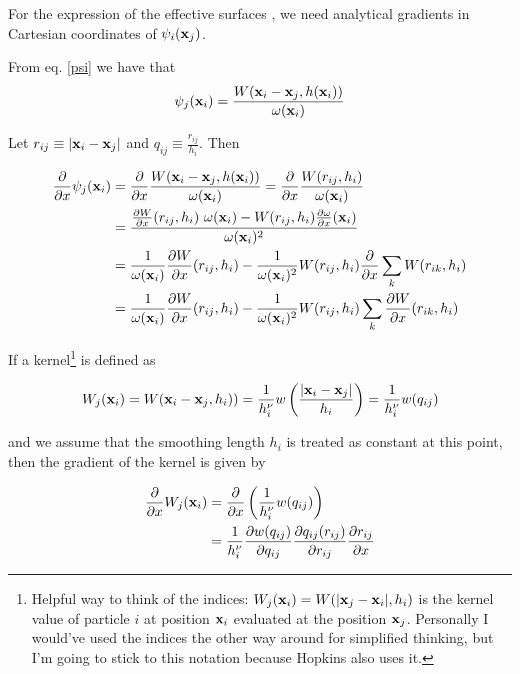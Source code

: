 For the \cite{ivanovaCommonEnvelopeEvolution2013} expression of the effective surfaces \Aij, we need analytical gradients in Cartesian coordinates of $\psi_i(\mathbf{x}_j)$.

From eq. \ref{psi} we have that
\begin{align*}
	\psi_j(\mathbf{x}_i) &= \frac{ W(\mathbf{x}_i - \mathbf{x}_j, h(\mathbf{x}_i))}{\omega(\mathbf{x}_i)}\\
\end{align*}

Let $r_{ij} \equiv |\mathbf{x}_i - \mathbf{x}_j|$ and $q_{ij} \equiv \frac{r_{ij}}{h_i}$. Then

\begin{align}
	\deldx \psi_j(\x_i) 	&= \deldx \frac{ W(\x_i - \x_j, h(\x_i))}{\omega(\x_i)} 
							=  \deldx \frac{ W(r_{ij}, h_i)}{\omega(\x_i)}		\nonumber \\
%
							&= \frac{ 
									\DELDX{W}(r_{ij}, h_i) \  \omega(\x_i) -
									W(r_{ij}, h_i) \DELDX{\omega}(\x_i)
									}{\omega(\x_i)^2}		\nonumber  \\
%
							&= \frac{1}{\omega(\x_i)} \DELDX{W}(r_{ij}, h_i) -
							\frac{1}{\omega(\x_i)^2} W(r_{ij}, h_i) \DELDX{}\sum_k W(r_{ik}, h_i)		\nonumber \\
%
							&= \frac{1}{\omega(\x_i)} \DELDX{W}(r_{ij}, h_i) -
									\frac{1}{\omega(\x_i)^2} W(r_{ij}, h_i) \sum_k \DELDX{W}(r_{ik}, h_i)	\label{grad_psi}
\end{align}






If a kernel\footnote{
Helpful way to think of the indices: $W_j(\mathbf{x}_i) = W(|\mathbf{x}_j - \mathbf{x}_i|, h_i)$ is the kernel value of particle $i$ at position $\mathbf{x}_i$ evaluated at the position $\mathbf{x}_j$.
Personally I would've used the indices the other way around for simplified thinking, but I'm going to stick to this notation because Hopkins also uses it.
}
is defined as

\begin{align*}
	W_j(\mathbf{x}_i)	 = W(\mathbf{x}_i - \mathbf{x}_j, h_i))
				 = \frac{1}{h_i^\nu} w \left(\frac{| \mathbf{x}_i - \mathbf{x}_j |}{h_i} \right)
				 =  \frac{1}{h_i^\nu} w ( q_{ij} )
\end{align*}





and we assume that the smoothing length $h_i$ is treated as constant at this point, then the gradient of the kernel is given by

\begin{align}
	\frac{\partial}{\partial x} W_j (\mathbf{x}_i) 	&= \frac{\partial}{\partial x} \left( \frac{1}{h_i^\nu} w ( q_{ij} )	\right)	\nonumber \\
						&= \frac{1}{h_i^\nu} \frac{\partial w(q_{ij})}{\partial q_{ij}} \frac{\partial q_{ij}(r_{ij})}{\partial r_{ij}} \frac{\partial r_{ij}}{\partial x} 	\label{grad_kernel}
\end{align}




